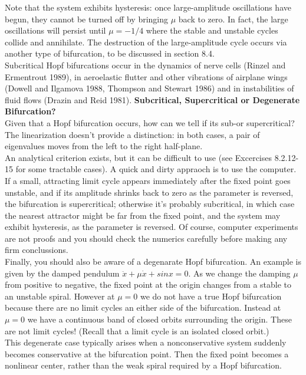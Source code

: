 \documentclass{article}
\newcommand\tab[1][1cm]{\hspace*{#1}}
\begin{document}
Note that the system exhibits hysteresis: once large-amplitude oscillations have begun, they cannot be turned off by bringing $\mu$ back to zero. In fact, the large oscillations will persist until $\mu = -1/4$ where the stable and unstable cycles collide and annihilate. The destruction of the large-amplitude cycle occurs via another type of bifurcation, to be discussed in section 8.4. \\ \tab
Subcritical Hopf bifurcations occur in the dynamics of nerve cells (Rinzel and Ermentrout 1989), in aeroelastic flutter and other vibrations of airplane wings (Dowell and Ilgamova 1988, Thompson and Stewart 1986) and in instabilities of fluid flows (Drazin and Reid 1981). 
\textbf {Subcritical, Supercritical or Degenerate Bifurcation?} \\ \tab
Given that a Hopf bifurcation occurs, how can we tell if its sub-or supercritical? The linearization doesn't provide a distinction: in both cases, a pair of eigenvalues moves from the left to the right half-plane. \\ \tab
An analytical criterion exists, but it can be difficult to use (see Excercises 8.2.12-15 for some tractable cases). A quick and dirty appraoch is to use the computer. If a small, attracting limit cycle appears immediately after the fixed point goes unstable, and if its amplitude shrinks back to zero as the parameter is reversed, the bifurcation is supercritical; otherwise it's probably subcritical, in which case the nearest attractor might be far from the fixed point, and the system may exhibit hysteresis, as the parameter is reversed. Of course, computer experiments are not proofs and you should check the numerics carefully before making any firm conclussions. \\ \tab
Finally, you should also be aware of a degenarate Hopf bifurcation. An example is given by the damped pendulum $\ddot{x}+\mu \dot{x}+sinx=0$. As we change the damping $\mu$ from positive to negative, the fixed point at the origin changes from a stable to an unstable spiral. However at $\mu = 0$ we do not have a true Hopf bifurcation because there are no limit cycles an either side of the bifurcation. Instead at $\mu=0$ we have a continuous band of closed orbits surrounding the origin. These are not limit cycles! (Recall that a limit cycle is an isolated closed orbit.) \\ \tab
This degenerate case typically arises when a nonconservative system suddenly becomes conservative at the bifurcation point. Then the fixed point becomes a nonlinear center, rather than the weak spiral required by a Hopf bifurcation. 
\end{document}
